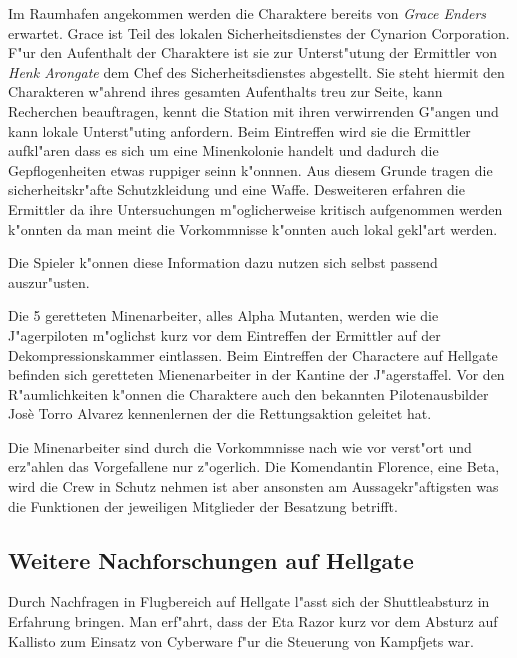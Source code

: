 Im Raumhafen angekommen werden die Charaktere bereits von \emph{Grace Enders} erwartet. Grace ist Teil  des lokalen Sicherheitsdienstes der Cynarion Corporation. F"ur den Aufenthalt der Charaktere ist sie zur Unterst"utung der Ermittler von \emph{Henk Arongate} dem Chef des Sicherheitsdienstes abgestellt. Sie steht hiermit den Charakteren w"ahrend ihres gesamten Aufenthalts treu zur Seite, kann Recherchen beauftragen, kennt die Station mit ihren verwirrenden G"angen und kann lokale Unterst"uting anfordern. Beim Eintreffen wird sie die Ermittler aufkl"aren dass es sich um eine Minenkolonie handelt und dadurch die Gepflogenheiten etwas ruppiger seinn k"onnnen. Aus diesem Grunde tragen die sicherheitskr"afte Schutzkleidung und eine Waffe. Desweiteren erfahren die Ermittler da\3 ihre Untersuchungen m"oglicherweise kritisch aufgenommen werden k"onnten da man meint die Vorkommnisse k"onnten auch lokal gekl"art werden.

\begin{remarks}
	Die Spieler k"onnen diese Information dazu nutzen sich selbst passend auszur"usten.
\end{remarks}

Die 5 geretteten Minenarbeiter, alles Alpha Mutanten, werden wie die J"agerpiloten m"oglichst kurz vor dem Eintreffen der Ermittler auf der Dekompressionskammer eintlassen. Beim Eintreffen der Charactere auf Hellgate befinden sich geretteten Mienenarbeiter in der Kantine der J"agerstaffel. Vor den R"aumlichkeiten k"onnen die Charaktere auch den bekannten Pilotenausbilder Jos\`{e} \frqq{}Torro\flqq{} Alvarez kennenlernen der die Rettungsaktion geleitet hat.

\begin{remarks}
	Die Minenarbeiter sind durch die Vorkommnisse nach wie vor verst"ort und erz"ahlen das Vorgefallene nur z"ogerlich. Die Komendantin Florence, eine Beta, wird die Crew in Schutz nehmen ist aber ansonsten am Aussagekr"aftigsten was die Funktionen der jeweiligen Mitglieder der Besatzung betrifft.
\end{remarks}

\subsection{Weitere Nachforschungen auf Hellgate}

Durch Nachfragen in Flugbereich auf Hellgate l"asst sich der Shuttleabsturz in Erfahrung bringen. Man erf"ahrt, dass der Eta Razor kurz vor dem Absturz auf Kallisto zum Einsatz von Cyberware f"ur die Steuerung von Kampfjets war.

